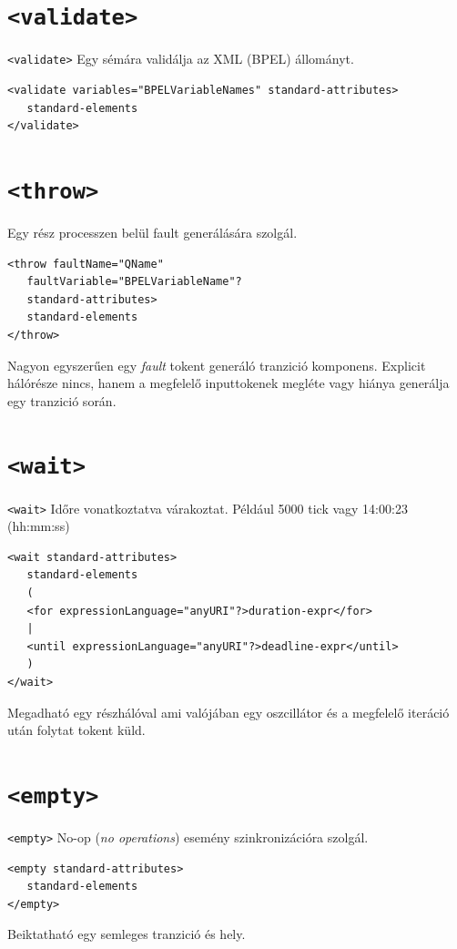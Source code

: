 \section{\texttt{<validate>}}

\texttt{<validate>} Egy sémára validálja az XML (BPEL) állományt. 
\begin{verbatim}
<validate variables="BPELVariableNames" standard-attributes>
   standard-elements
</validate>
\end{verbatim}

\section{\texttt{<throw>}}

Egy rész processzen belül fault generálására szolgál. 
\begin{verbatim}
<throw faultName="QName"
   faultVariable="BPELVariableName"?
   standard-attributes>
   standard-elements
</throw>
\end{verbatim}
Nagyon egyszerűen egy \textit{fault} tokent generáló tranzició komponens. Explicit hálórésze nincs, hanem a megfelelő inputtokenek megléte vagy hiánya generálja egy tranzició során. 

\section{\texttt{<wait>}}

\texttt{<wait>} Időre vonatkoztatva várakoztat. Például 5000 tick vagy 14:00:23 (hh:mm:ss)
\begin{verbatim} 
<wait standard-attributes>
   standard-elements
   (
   <for expressionLanguage="anyURI"?>duration-expr</for>
   |
   <until expressionLanguage="anyURI"?>deadline-expr</until>
   )
</wait>
\end{verbatim}
Megadható egy részhálóval ami valójában egy oszcillátor és a megfelelő iteráció után folytat tokent küld. 

\section{\texttt{<empty>}}

\texttt{<empty>} No-op (\textit{no operations}) esemény szinkronizációra szolgál.
\begin{verbatim}
<empty standard-attributes>
   standard-elements
</empty>
\end{verbatim}
Beiktatható egy semleges tranzició és hely.

